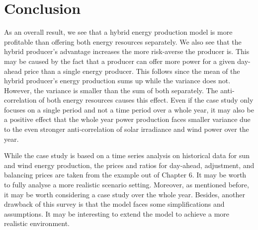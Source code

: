 \section{Conclusion}

As an overall result, we see that a hybrid energy production model is more profitable than offering both energy resources separately. We also see that the hybrid producer's advantage increases the more risk-averse the producer is. This may be caused by the fact that a producer can offer more power for a given day-ahead price than a single energy producer. This follows since the mean of the hybrid producer's energy production sums up while the variance does not. However, the variance is smaller than the sum of both separately. The anti-correlation of both energy resources causes this effect. 
Even if the case study only focuses on a single period and not a time period over a whole year, it may also be a positive effect that the whole year power production faces smaller variance due to the even stronger anti-correlation of solar irradiance and wind power over the year. 

While the case study is based on a time series analysis on historical data for sun and wind energy production, the prices and ratios for day-ahead, adjustment, and balancing prices are taken from the example out of \cite{Conejo10} Chapter 6. It may be worth to fully analyse a more realistic scenario setting. Moreover, as mentioned before, it may be worth considering a case study over the whole year. 
Besides, another drawback of this survey is that the model faces some simplifications and assumptions. It may be interesting to extend the model to achieve a more realistic environment. 
